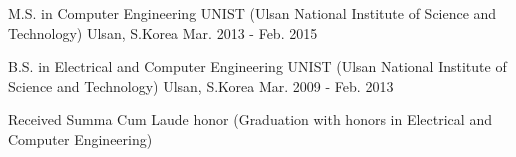 


\begin{cventries}


\cventry
{M.S. in Computer Engineering} %
{UNIST (Ulsan National Institute of Science and Technology)} %
{Ulsan, S.Korea} %
{Mar. 2013 - Feb. 2015} %
{ %
}


\cventry
{B.S. in Electrical and Computer Engineering} %
{UNIST (Ulsan National Institute of Science and Technology)} %
{Ulsan, S.Korea} %
{Mar. 2009 - Feb. 2013} %
{ %
\begin{cvitems}
\item {Received Summa Cum Laude honor (Graduation with honors in Electrical and Computer Engineering)}
\end{cvitems}
}


\end{cventries}
